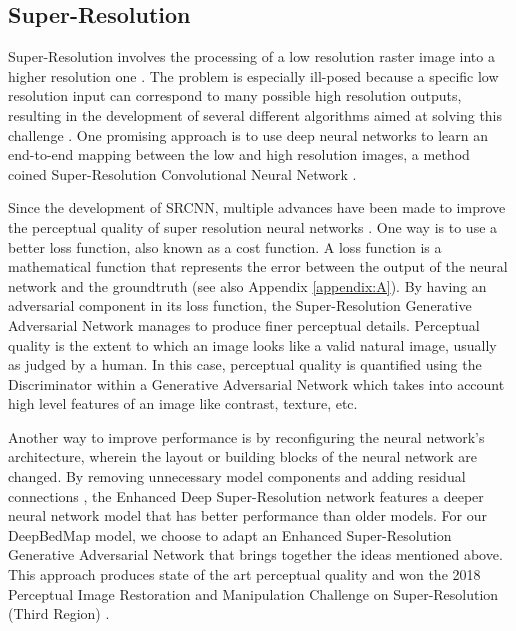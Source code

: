 \documentclass[tc, manuscript]{copernicus}
\begin{document}
\subsection{Super-Resolution} \label{section:superresolution}

Super-Resolution involves the processing of a low resolution raster image into a higher resolution one \citep{TsaiMultiframeimagerestoration1984}.
The problem is especially ill-posed because a specific low resolution input can correspond to many possible high resolution outputs, resulting in the development of several different algorithms aimed at solving this challenge \citep[see][for a review]{NasrollahiSuperresolutioncomprehensivesurvey2014}.
One promising approach is to use deep neural networks \citep{LeCunDeeplearning2015} to learn an end-to-end mapping between the low and high resolution images, a method coined Super-Resolution Convolutional Neural Network  \citep[SRCNN,][]{DongImageSuperResolutionUsing2014}.

Since the development of SRCNN, multiple advances have been made to improve the perceptual quality of super resolution neural networks \cite[see][for a review]{YangDeepLearningSingle2018}.
One way is to use a better loss function, also known as a cost function.
A loss function is a mathematical function that represents the error between the output of the neural network and the groundtruth (see also Appendix \ref{appendix:A}).
By having an adversarial component in its loss function, the Super-Resolution Generative Adversarial Network \citep[SRGAN,][]{LedigPhotoRealisticSingleImage2016} manages to produce finer perceptual details.
Perceptual quality is the extent to which an image looks like a valid natural image, usually as judged by a human.
In this case, perceptual quality is quantified using the Discriminator within a Generative Adversarial Network \citep{GoodfellowGenerativeAdversarialNetworks2014} which takes into account high level features of an image like contrast, texture, etc.

Another way to improve performance is by reconfiguring the neural network's architecture, wherein the layout or building blocks of the neural network are changed.
By removing unnecessary model components and adding residual connections \citep{HeDeepResidualLearning2015}, the Enhanced Deep Super-Resolution network \citep[EDSR,][]{LimEnhancedDeepResidual2017} features a deeper neural network model that has better performance than older models.
For our DeepBedMap model, we choose to adapt an Enhanced Super-Resolution Generative Adversarial Network \citep[ESRGAN,][]{WangESRGANEnhancedSuperResolution2018} that brings together the ideas mentioned above.
This approach produces state of the art perceptual quality and won the 2018 Perceptual Image Restoration and Manipulation Challenge on Super-Resolution (Third Region) \citep{Blau2018PIRMChallenge2018}.
\end{document}
